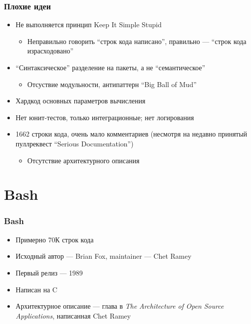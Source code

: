 \documentclass[xetex,mathserif,serif]{beamer}
\begin{document}
	\begin{frame}
		\frametitle{Плохие идеи}
		\begin{itemize}
			\item Не выполняется принцип Keep It Simple Stupid
			\begin{itemize}
				\item Неправильно говорить ``строк кода написано'', правильно --- ``строк кода израсходовано''
			\end{itemize}
			\item ``Синтаксическое'' разделение на пакеты, а не ``семантическое''
			\begin{itemize}
				\item Отсуствие модульности, антипаттерн ``Big Ball of Mud''
			\end{itemize}
			\item Хардкод основных параметров вычисления
			\item Нет юнит-тестов, только интеграционные; нет логирования
			\item 1662 строки кода, очень мало комментариев (несмотря на недавно принятый пуллреквест ``Serious Documentation'')
			\begin{itemize}
				\item Отсутствие архитектурного описания
			\end{itemize}
		\end{itemize}
	\end{frame}

	\section{Bash}

	\begin{frame}
		\frametitle{Bash}
		\begin{itemize}
			\item Примерно 70К строк кода
			\item Исходный автор --- Brian Fox, maintainer --- Chet Ramey
			\item Первый релиз --- 1989
			\item Написан на C
			\item Архитектурное описание --- глава в \textit{The Architecture of Open Source Applications}, написанная Chet Ramey
		\end{itemize}
	\end{frame}
\end{document}
